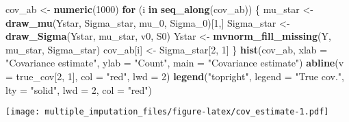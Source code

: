 \documentclass[]{article}
\newenvironment{Shaded}{\begin{snugshade}}{\end{snugshade}}
\newcommand{\ControlFlowTok}[1]{\textcolor[rgb]{0.13,0.29,0.53}{\textbf{#1}}}
\newcommand{\DataTypeTok}[1]{\textcolor[rgb]{0.13,0.29,0.53}{#1}}
\newcommand{\DecValTok}[1]{\textcolor[rgb]{0.00,0.00,0.81}{#1}}
\newcommand{\KeywordTok}[1]{\textcolor[rgb]{0.13,0.29,0.53}{\textbf{#1}}}
\newcommand{\NormalTok}[1]{#1}
\newcommand{\StringTok}[1]{\textcolor[rgb]{0.31,0.60,0.02}{#1}}
\begin{document}
\begin{Shaded}
\begin{Highlighting}[]
\NormalTok{cov_ab <-}\StringTok{ }\KeywordTok{numeric}\NormalTok{(}\DecValTok{1000}\NormalTok{)}
\ControlFlowTok{for}\NormalTok{ (i }\ControlFlowTok{in} \KeywordTok{seq_along}\NormalTok{(cov_ab)) \{}
\NormalTok{  mu_star <-}\StringTok{ }\KeywordTok{draw_mu}\NormalTok{(Ystar, Sigma_star, mu_}\DecValTok{0}\NormalTok{, Sigma_}\DecValTok{0}\NormalTok{)[}\DecValTok{1}\NormalTok{,]}
\NormalTok{  Sigma_star <-}\StringTok{ }\KeywordTok{draw_Sigma}\NormalTok{(Ystar, mu_star, v0, S0)}
\NormalTok{  Ystar <-}\StringTok{ }\KeywordTok{mvnorm_fill_missing}\NormalTok{(Y, mu_star, Sigma_star)}
\NormalTok{  cov_ab[i] <-}\StringTok{ }\NormalTok{Sigma_star[}\DecValTok{2}\NormalTok{, }\DecValTok{1}\NormalTok{]}
\NormalTok{\}}
\KeywordTok{hist}\NormalTok{(cov_ab, }\DataTypeTok{xlab =} \StringTok{"Covariance estimate"}\NormalTok{, }\DataTypeTok{ylab =} \StringTok{"Count"}\NormalTok{, }\DataTypeTok{main =} \StringTok{"Covariance estimate"}\NormalTok{)}
\KeywordTok{abline}\NormalTok{(}\DataTypeTok{v =}\NormalTok{ true_cov[}\DecValTok{2}\NormalTok{, }\DecValTok{1}\NormalTok{], }\DataTypeTok{col =} \StringTok{"red"}\NormalTok{, }\DataTypeTok{lwd =} \DecValTok{2}\NormalTok{)}
\KeywordTok{legend}\NormalTok{(}\StringTok{"topright"}\NormalTok{, }\DataTypeTok{legend =} \StringTok{"True cov."}\NormalTok{, }\DataTypeTok{lty =} \StringTok{"solid"}\NormalTok{, }\DataTypeTok{lwd =} \DecValTok{2}\NormalTok{, }\DataTypeTok{col =} \StringTok{"red"}\NormalTok{)}
\end{Highlighting}
\end{Shaded}

\texttt{[image: multiple\_imputation\_files/figure-latex/cov\_estimate-1.pdf]}
\end{document}
